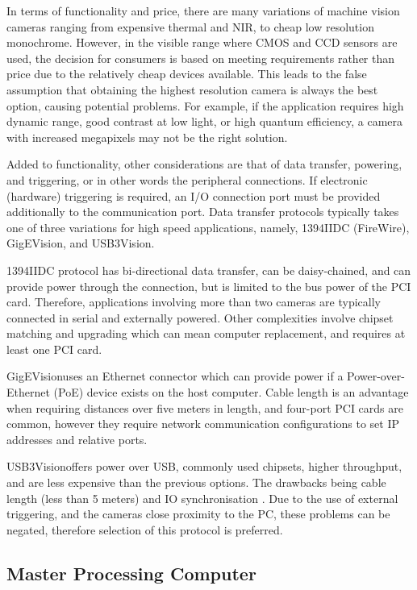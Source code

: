 \documentclass[fleqn,twoside,12pt]{report}
\begin{document}
In terms of functionality and price, there are many variations of machine vision cameras ranging from expensive thermal and NIR, to cheap low resolution monochrome. However, in the visible range where CMOS and CCD sensors are used, the decision for consumers is based on meeting requirements rather than price due to the relatively cheap devices available. This leads to the false assumption that obtaining the highest resolution camera is always the best option, causing potential problems. For example, if the application requires high dynamic range, good contrast at low light, or high quantum efficiency, a camera with increased megapixels may not be the right solution.

Added to functionality, other considerations are that of data transfer, powering, and triggering, or in other words the peripheral connections. If electronic (hardware) triggering is required, an I/O connection port must be provided additionally to the communication port. Data transfer protocols typically takes one of three variations for high speed applications, namely, 1394IIDC (FireWire\texttrademark), GigEVision\textregistered, and USB3Vision\textregistered. 

1394IIDC protocol has bi-directional data transfer, can be daisy-chained, and can provide power through the connection, but is limited to the bus power of the PCI card. Therefore, applications involving more than two cameras are typically connected in serial and externally powered. Other complexities involve chipset matching and upgrading which can mean computer replacement, and requires at least one PCI card. 

GigEVision\textregistered uses an Ethernet connector which can provide power if a Power-over-Ethernet (PoE) device exists on the host computer. Cable length is an advantage when requiring distances over five meters in length, and four-port PCI cards are common, however they require network communication configurations to set IP addresses and relative ports.

USB3Vision\textregistered offers power over USB, commonly used chipsets, higher throughput, and are less expensive than the previous options. The drawbacks being cable length (less than 5 meters) and IO synchronisation \cite{camera_bus}. Due to the use of external triggering, and the cameras close proximity to the PC, these problems can be negated, therefore selection of this protocol is preferred.




\subsection{Master Processing Computer}
\end{document}
